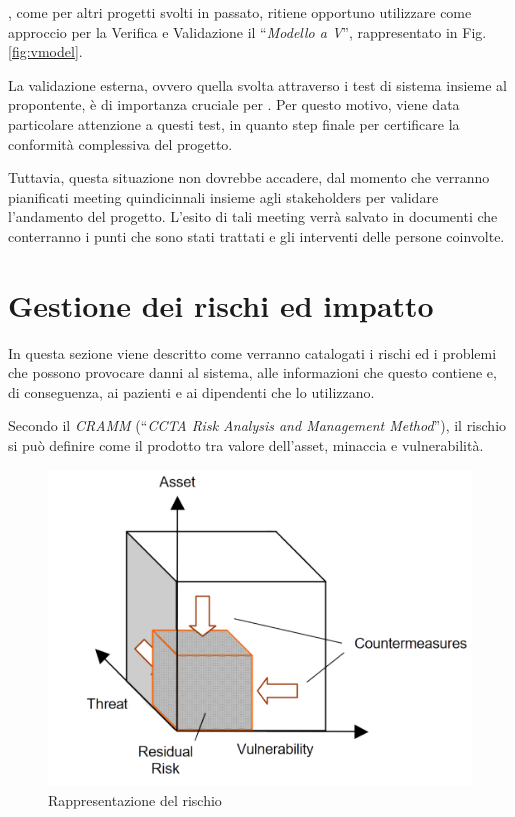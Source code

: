 	\azienda, come per altri progetti svolti in passato, ritiene opportuno utilizzare come approccio per la Verifica e Validazione il ``\textit{Modello a V}'', rappresentato in Fig. \ref{fig:vmodel}.
	
	La validazione esterna, ovvero quella svolta attraverso i test di sistema insieme al propontente, è di importanza cruciale per \azienda.
	Per questo motivo, viene data particolare attenzione a questi test, in quanto step finale per certificare la conformità complessiva del progetto.
	
	Tuttavia, questa situazione non dovrebbe accadere, dal momento che verranno pianificati meeting quindicinnali insieme agli stakeholders per validare l'andamento del progetto.
	L'esito di tali meeting verrà salvato in documenti che conterranno i punti che sono stati trattati e gli interventi delle persone coinvolte.

\section{Gestione dei rischi ed impatto}\label{sec:rischi}

	In questa sezione viene descritto come verranno catalogati i rischi ed i problemi che possono provocare danni al sistema, alle informazioni che questo contiene e, di conseguenza, ai pazienti e ai dipendenti che lo utilizzano.
	
	Secondo il \textit{CRAMM} (``\textit{CCTA Risk Analysis and Management Method}''), il rischio si può definire come il prodotto tra valore dell'asset, minaccia e vulnerabilità.
	
	\begin{figure}[h!]
		\centering
		\includegraphics[width=\linewidth-2cm]{img/risk.png}
		\caption{Rappresentazione del rischio\cite{risk}}
		\label{fig:risk}
	\end{figure}

